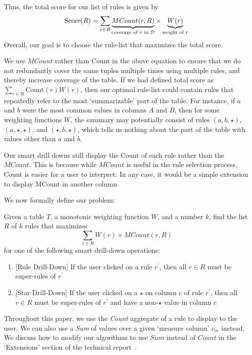 Thus, the total score for our list of rules is given by 
$$\text{Score}(R) = \sum_{r \in R} \underbrace{MCount(r, R)}_{\text{coverage of $r$ in $\mathcal{D}$}} \times \underbrace{W(r)}_{\text{weight of $r$}}$$ 
Overall, our goal is to choose the rule-list that maximizes the 
total score. 


We use $MCount$ rather than Count in the above equation to ensure that we do not redundantly cover
the same tuples multiple times using multiple rules, and thereby increase coverage of the table. 
If we had defined total score as $\sum_{r \in R} \text{Count}(r)W(r)$, then our optimal rule-list could 
contain rules that repeatedly refer to the most `summarizable' part of the table. 
For instance, if $a$ and $b$ were the most common values in columns $A$ and $B$, then 
for some weighting functions $W$, 
the summary may potentially consist of rules $(a, b, \star)$, $(a, \star, \star)$, and $(\star, b, \star)$, which tells us nothing about the part of the table with values other than $a$ and $b$. 

Our smart drill downs still display the Count of each rule rather than the $MCount$. This is because while $MCount$ is useful in the rule selection process, Count is easier for a user to interpret. In any case, it would be a simple extension to display MCount in another column.

 We now formally define our problem:
\begin{problem}\label{prob:optimal-subrule-list}
Given a table $T$, a monotonic weighting function $W$, and a number $k$, find the list $R$ of $k$ rules that maximizes 
$$\sum_{r \in R} W(r) \times MCount(r,R)$$
for one of the following smart drill-down operations:
\begin{enumerate}
\item $[$Rule Drill-Down$]$ If the user clicked on a rule $r^{\prime}$, then all $r \in R$ must be super-rules of $r^{\prime}$
\item $[$Star Drill-Down$]$ If the user clicked on a $\star$ on column $c$ of rule $r^{\prime}$, then all $r \in R$ must be super-rules of $r^{\prime}$ and have a non-$\star$ value in column $c$
\end{enumerate}
\end{problem}
Throughout this paper, we use the {\em Count} aggregate of a rule to display to the user. We can also use a {\em Sum} of values over a given `measure column' $c_m$ instead. We discuss how to modify our algorithms to use $Sum$ instead of $Count$ in the `Extensions' section of the technical report~\cite{tr}.

